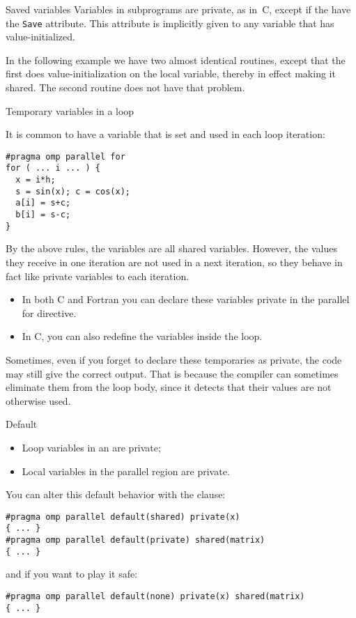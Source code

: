 \begin{fortrannote}{Saved variables}
  Variables in subprograms are private, as in~C,
  except if the have the \lstinline{Save} attribute.
  This attribute is implicitly given to any variable
  that has value-initialized.

  In the following example we have two almost identical routines,
  except that the first does value-initialization on the local variable,
  thereby in effect making it shared. The second routine does not have that problem.
  
\end{fortrannote}

 {Temporary variables in a loop}

It is common to have a variable that is set and used in each loop
iteration:
\begin{lstlisting}
#pragma omp parallel for
for ( ... i ... ) {
  x = i*h;
  s = sin(x); c = cos(x);
  a[i] = s+c;
  b[i] = s-c;
}
\end{lstlisting}
By the above rules, the variables  are all shared
variables. However, the values they receive in one iteration are not
used in a next iteration, so they behave in fact like private
variables to each iteration.
\begin{itemize}
\item In both C and Fortran you can declare these variables private in
  the parallel for directive.
\item In C, you can also redefine the variables inside the loop.
\end{itemize}

Sometimes, even if you forget to declare these temporaries as private,
the code may still give the correct output. That is because the
compiler can sometimes eliminate them from the loop body, since it detects that their
values are not otherwise used.

 {Default}

\begin{itemize}
\item Loop variables in an  are private;
\item Local variables in the parallel region are private.
\end{itemize}
You can alter this default behavior with the  clause:
\begin{lstlisting}
#pragma omp parallel default(shared) private(x)
{ ... }
#pragma omp parallel default(private) shared(matrix)
{ ... }
\end{lstlisting}
and if you want to play it safe:
\begin{lstlisting}
#pragma omp parallel default(none) private(x) shared(matrix)
{ ... }
\end{lstlisting}

